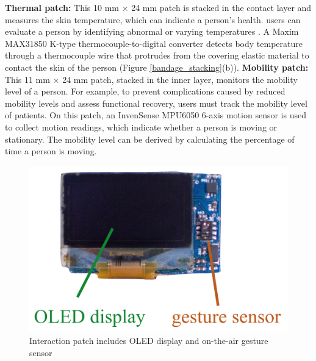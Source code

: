 \vspace{10pt}
\newline
\textbf{Thermal patch:}
\newline
This 10 mm × 24 mm patch is stacked in the contact layer and measures the skin temperature, which can indicate a person's health. users can evaluate a person by identifying abnormal or varying temperatures \cite{Freitas1999}. A Maxim MAX31850 K-type thermocouple-to-digital converter detects body temperature through a thermocouple wire that protrudes from the covering elastic material to contact the skin of the person (Figure \ref{bandage_stacking}(b)).
\vspace{10pt}
\newline
\textbf{Mobility patch:}
\newline
This 11 mm × 24 mm patch, stacked in the inner layer, monitors the mobility level of a person. For example, to prevent complications caused by reduced mobility levels and assess functional recovery, users must track the mobility level of patients. On this patch, an InvenSense MPU6050 6-axis motion sensor is used to collect motion readings, which indicate whether a person is moving or stationary. The mobility level can be derived by calculating the percentage of time a person is moving.


\begin{figure}
\centering
\includegraphics[width=14cm]{image/bio_fig1_5}
\caption{Interaction patch includes OLED display and on-the-air gesture sensor}
\label{interaction_patch}
\end{figure}


